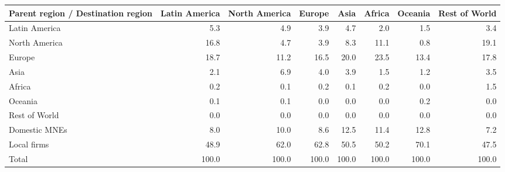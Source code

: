 \begin{tabular}{lrrrrrrr}
\toprule
Parent region / Destination region & Latin America & North America & Europe & Asia & Africa & Oceania & Rest of World \\
\midrule
Latin America & 5.3 & 4.9 & 3.9 & 4.7 & 2.0 & 1.5 & 3.4 \\
North America & 16.8 & 4.7 & 3.9 & 8.3 & 11.1 & 0.8 & 19.1 \\
Europe & 18.7 & 11.2 & 16.5 & 20.0 & 23.5 & 13.4 & 17.8 \\
Asia & 2.1 & 6.9 & 4.0 & 3.9 & 1.5 & 1.2 & 3.5 \\
Africa & 0.2 & 0.1 & 0.2 & 0.1 & 0.2 & 0.0 & 1.5 \\
Oceania & 0.1 & 0.1 & 0.0 & 0.0 & 0.0 & 0.2 & 0.0 \\
Rest of World & 0.0 & 0.0 & 0.0 & 0.0 & 0.0 & 0.0 & 0.0 \\
Domestic MNEs & 8.0 & 10.0 & 8.6 & 12.5 & 11.4 & 12.8 & 7.2 \\
Local firms & 48.9 & 62.0 & 62.8 & 50.5 & 50.2 & 70.1 & 47.5 \\
\midrule
Total & 100.0 & 100.0 & 100.0 & 100.0 & 100.0 & 100.0 & 100.0 \\
\bottomrule
\end{tabular}

